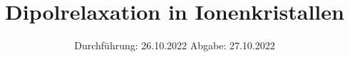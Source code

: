 

\subject{VERSUCH 48}
\title{Dipolrelaxation in Ionenkristallen}
\date{%
  Durchführung: 26.10.2022
  \hspace{3em}
  Abgabe: 27.10.2022
}



\maketitle
\thispagestyle{empty}
\tableofcontents
\newpage







\printbibliography{}


